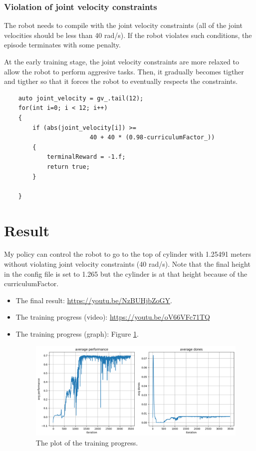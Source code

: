 \documentclass{article}
\begin{document}
    \subsubsection{Violation of joint velocity constraints}
        The robot needs to compile with the joint velocity constraints (all of the joint velocities should be less than 40 rad/s).
    If the robot violates such conditions, the episode terminates with some penalty.

        At the early training stage, the joint velocity constraints are more relaxed to allow the robot to perform aggresive tasks.
    Then, it gradually becomes tigther and tigther so that it forces the robot to eventually respects the constraints. 

    \begin{verbatim}
    auto joint_velocity = gv_.tail(12);
    for(int i=0; i < 12; i++)
    {
        if (abs(joint_velocity[i]) >= 
                        40 + 40 * (0.98-curriculumFactor_))
        {
            terminalReward = -1.f;
            return true;
        }
        
    } 
    \end{verbatim}


\section{Result}
    My policy can control the robot to go to the top of cylinder with 1.25491 meters without violating joint velocity constraints (40 rad/s).
    Note that the final height in the config file is set to 1.265 but the cylinder is at that height because of the curriculumFactor.
    \begin{itemize}
        \item The final result: \url{https://youtu.be/NzBUHjbZoGY}. 
        \item The training progress (video): \url{https://youtu.be/oV66VFc71TQ}
        \item The training progress (graph): Figure \ref{fig:training_progress}.
            \begin{figure}
                \includegraphics[width=\linewidth]{demo.png}
                \caption{The plot of the training progress.}
                \label{fig:training_progress}
            \end{figure}
            
    \end{itemize}
\end{document}
